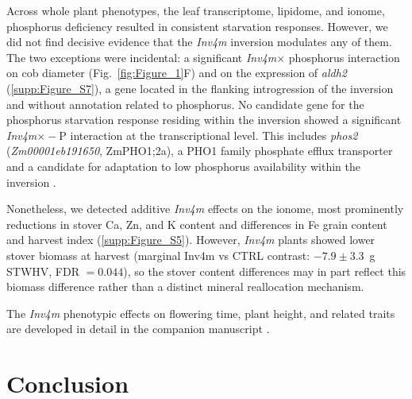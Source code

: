 \documentclass[9pt,twocolumn,twoside]{rilabRxiv}
\newcommand{\invfour}{\textit{Inv4m}\xspace}
\begin{document}
Across whole plant phenotypes, the leaf transcriptome, lipidome, and ionome, phosphorus deficiency resulted in consistent starvation responses.
However, we did not find decisive evidence that the \invfour inversion modulates any of them.
The two exceptions were incidental: a significant \invfour $\times$ phosphorus interaction on cob diameter (Fig.~\ref{fig:Figure_1}F) and on the expression of \textit{aldh2} (\ref{supp:Figure_S7}), a gene located in the flanking introgression of the inversion and without annotation related to phosphorus.
No candidate gene for the phosphorus starvation response residing within the inversion showed a significant \invfour $\times -$P interaction at the transcriptional level.
This includes \textit{phos2} (\textit{Zm00001eb191650}, ZmPHO1;2a), a PHO1 family phosphate efflux transporter and a candidate for adaptation to low phosphorus availability within the inversion \cite{salazar-vidal2016, ma2021,alonsonieves2022, zhang2025}.

Nonetheless, we detected additive \invfour effects on the ionome, most prominently reductions in stover Ca, Zn, and K content and differences in Fe grain content and harvest index (\ref{supp:Figure_S5}).
However, \invfour plants showed lower stover biomass at harvest (marginal Inv4m vs CTRL contrast: $-7.9 \pm 3.3$~g STWHV, FDR $= 0.044$), so the stover content differences may in part reflect this biomass difference rather than a distinct mineral reallocation mechanism.

The \invfour phenotypic effects on flowering time, plant height, and related traits are developed in detail in the companion manuscript \cite{rodriguez2026inversion}.

\section*{Conclusion}
\end{document}

